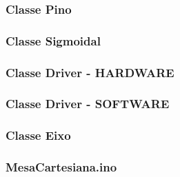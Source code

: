 \begin{frame}
    \frametitle{Classe Pino}
    
\end{frame}

\begin{frame}
    \frametitle{Classe Sigmoidal}
    
\end{frame}

\begin{frame}
    \frametitle{Classe Driver - HARDWARE}
    
\end{frame}

\begin{frame}
    \frametitle{Classe Driver - SOFTWARE}
    
\end{frame}

\begin{frame}
    \frametitle{Classe Eixo}
    
\end{frame}

\begin{frame}
    \frametitle{MesaCartesiana.ino}
    
\end{frame}